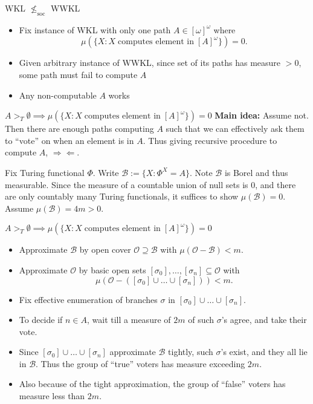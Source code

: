 \begin{frame}{WKL $\nleq_{\text{soc}}$ WWKL}
  \begin{itemize}
    \item Fix instance of WKL with only one path $A\in[\omega]^\omega$ where
      \[\mu(\{X: X\; \text{computes element in}\; [A]^\omega\}) =0.\]
    \item Given arbitrary instance of WWKL, since set of its paths has
      measure $>0$, some path must fail to compute $A$ 
    \item Any non-computable $A$ works
  \end{itemize}
\end{frame}

\begin{frame}{$A>_T\emptyset \implies\mu(\{X: X\; \text{computes element
in}\; [A]^\omega\}) =0$}
  \textbf{Main idea:} Assume not. Then there are enough paths computing
  $A$ such that we can effectively ask them to ``vote''
  on when an element is in $A$. Thus giving recursive procedure to compute
  $A$, $\Rightarrow\Leftarrow$.
  \vspace{1em}

  Fix Turing functional $\Phi$. Write $\mathcal{B} :=\{X:
  \Phi^X=A\}$. Note $\mathcal{B}$ is Borel and thus measurable.
  Since the measure of a countable union of null sets is 0, and
  there are only countably many Turing functionals, it suffices to show
  $\mu(\mathcal{B})=0$. Assume $\mu(\mathcal{B})=4m>0$.
\end{frame}

\begin{frame}{$A>_T\emptyset \implies\mu(\{X: X\; \text{computes element
in}\; [A]^\omega\}) =0$}
  \begin{itemize}
    \item Approximate $\mathcal{B}$ by open cover
      $\mathcal{O}\supseteq\mathcal{B}$ with
      $\mu(\mathcal{O}-\mathcal{B})<m$.
    \item Approximate $\mathcal{O}$ by basic open sets
      $[\sigma_0],\ldots,[\sigma_n] \subseteq\mathcal{O}$ with
      \[\mu(\mathcal{O}-([\sigma_0]\cup\ldots\cup[\sigma_n])) <m.\]
    \item Fix effective enumeration of branches $\sigma$ in
      $[\sigma_0]\cup\ldots\cup[\sigma_n]$.
    \item To decide if $n\in A$, wait till a measure of $2m$ of such
      $\sigma$'s agree, and take their vote.
    \item Since $[\sigma_0]\cup\ldots\cup[\sigma_n]$ approximate
      $\mathcal{B}$ tightly, such $\sigma$'s exist, and they all lie in
      $\mathcal{B}$. Thus the group of ``true'' voters has measure
      exceeding $2m$.
    \item Also because of the tight approximation, the group of ``false''
      voters has measure less than $2m$.
  \end{itemize}
\end{frame}

